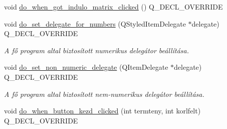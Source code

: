 \begin{DoxyCompactItemize}
\item 
void \hyperlink{classMainvindow__gui__plugin__for__fules_a79f10558ac2aaba9cee238b3fde817ae}{do\+\_\+when\+\_\+got\+\_\+indulo\+\_\+matrix\+\_\+clicked} () Q\+\_\+\+D\+E\+C\+L\+\_\+\+O\+V\+E\+R\+R\+I\+DE
\item 
void \hyperlink{classMainvindow__gui__plugin__for__fules_a7a76e31c7008ec8a41db6dc0ebbe20ee}{do\+\_\+set\+\_\+delegate\+\_\+for\+\_\+numbers} (Q\+Styled\+Item\+Delegate $\ast$delegate) Q\+\_\+\+D\+E\+C\+L\+\_\+\+O\+V\+E\+R\+R\+I\+DE
\begin{DoxyCompactList}\small\item\em A fő program altal biztosított numerikus delegátor beállítása. \end{DoxyCompactList}\item 
void \hyperlink{classMainvindow__gui__plugin__for__fules_a260b143aa4bf25e3f8fa6d2de08aca3d}{do\+\_\+set\+\_\+non\+\_\+numeric\+\_\+delegate} (Q\+Item\+Delegate $\ast$delegate) Q\+\_\+\+D\+E\+C\+L\+\_\+\+O\+V\+E\+R\+R\+I\+DE
\begin{DoxyCompactList}\small\item\em A fő program altal biztosított nem-\/numerikus delegátor beállítása. \end{DoxyCompactList}\item 
void \hyperlink{classMainvindow__gui__plugin__for__fules_ab655a7eceb4371004b43ae4e29cc4244}{do\+\_\+when\+\_\+button\+\_\+kezd\+\_\+clicked} (int termteny, int korlfelt) Q\+\_\+\+D\+E\+C\+L\+\_\+\+O\+V\+E\+R\+R\+I\+DE
\end{DoxyCompactItemize}
